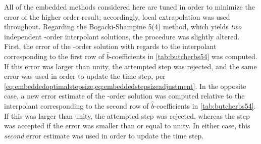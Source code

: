 All of the embedded methods considered here are tuned in order to minimize
the error of the higher order result; accordingly, local extrapolation was
used throughout. Regarding the Bogacki-Shampine 5(4) method, which yields
\emph{two} independent -order interpolant solutions, the procedure was
slightly altered. First, the error of the -order solution with regards to
the interpolant corresponding to the first row of $\widehat{b}$-coefficients in
\cref{tab:butcherbs54} was computed. If this error was larger than unity,
the attempted step was rejected, and the same error was used in order to
update the time step, per
\cref{eq:embeddedoptimalstepsize,eq:embeddedstepsizeadjustment}. In the
opposite case, a new error estimate of the -order solution was computed
relative to the interpolant corresponding to the second row of
$\widehat{b}$-coefficients in \cref{tab:butcherbs54}. If this was larger than
unity, the attempted step was rejected, whereas the step was accepted if the
error was smaller than or equal to unity. In either case, this \emph{second}
error estimate was used in order to update the time step.
